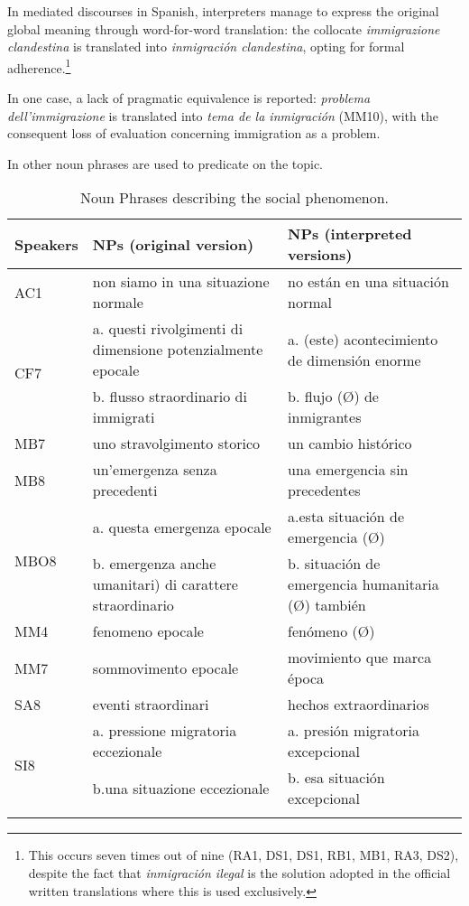 \documentclass[output=paper]{langscibook}
\begin{document}
In mediated discourses in Spanish, interpreters manage to express the original global meaning through word-for-word translation: the collocate \textit{immigrazione clandestina} is translated into \textit{inmigración clandestina}, opting for formal adherence.\footnote{This occurs seven times out of nine (RA1, DS1, DS1, RB1, MB1, RA3, DS2), despite the fact that \textit{inmigración ilegal} is the solution adopted in the official written translations where this is used exclusively.}

In one case, a lack of pragmatic equivalence is reported: \textit{problema} \textit{dell’immi\-gra\-zio\-ne} is translated into \textit{tema de la inmigración} (MM10), with the consequent loss of evaluation concerning immigration as a problem.

In  other noun phrases are used to predicate on the topic.

\begin{table}
\begin{tabularx}{\textwidth}{lXX}

\lsptoprule

{\bfseries Speakers} & {\bfseries NPs (original version)} & {\bfseries NPs (interpreted versions)}\\
\midrule
AC1 & non siamo in una situazione normale & no están en una situación normal\\
\multirow[t]{2}{*}{CF7} & a. questi rivolgimenti di dimensione potenzialmente epocale
& a. (este) acontecimiento de dimensión enorme\\
& b. flusso straordinario di immigrati &
b. flujo (Ø) de inmigrantes\\
MB7 & uno stravolgimento storico & un cambio histórico\\
MB8 & un’emergenza senza precedenti & una emergencia sin precedentes\\
\multirow[t]{2}{*}{MBO8} & a. questa emergenza epocale & a.esta situación de emergencia (Ø)\\
& b. emergenza anche umanitari) di carattere straordinario &
b. situación de emergencia humanitaria (Ø) también\\
MM4 & fenomeno epocale & fenómeno (Ø)\\
MM7 & sommovimento epocale & movimiento que marca época\\
SA8 & eventi straordinari & hechos extraordinarios\\
\multirow[t]{2}{*}{SI8} & a. pressione migratoria eccezionale
& a. presión migratoria excepcional\\
& b.una situazione eccezionale &
b. esa situación excepcional\\
\lspbottomrule
\end{tabularx}
\caption{Noun Phrases describing the social phenomenon.}
\label{tab:mori:3}
\end{table}
\end{document}
